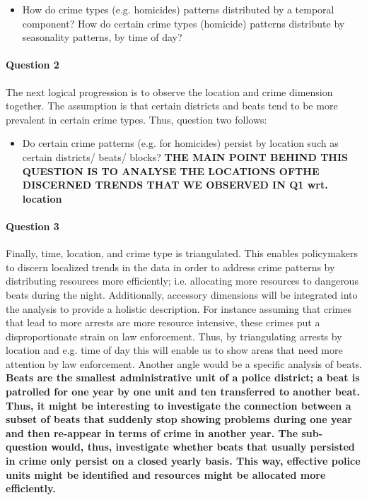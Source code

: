 \documentclass[a4paper]{article}
\begin{document}
\begin{itemize}
  \item How do crime types (e.g. homicides) patterns distributed by a temporal component? How do certain crime types (homicide) patterns distribute by seasonality patterns, by time of day?
\end{itemize}

\paragraph{Question 2} The next logical progression is to observe the location and crime dimension together. The assumption is that certain districts and beats tend to be more prevalent in certain crime types. Thus, question two follows:

\begin{itemize}
  \item Do certain crime patterns (e.g. for homicides) persist by location such as certain districts/ beats/ blocks?
  \textbf{THE MAIN POINT BEHIND THIS QUESTION IS TO ANALYSE THE LOCATIONS OFTHE DISCERNED TRENDS THAT WE OBSERVED IN Q1 wrt. location}
\end{itemize}

\paragraph{Question 3} Finally, time, location, and crime type is triangulated. This enables policymakers to discern localized trends in the data in order to address crime patterns by distributing resources more efficiently; i.e. allocating more resources to dangerous beats during the night. Additionally, accessory dimensions will be integrated into the analysis to provide a holistic description. For instance assuming that crimes that lead to more arrests are more resource intensive, these crimes put a disproportionate strain on law enforcement. Thus, by triangulating arrests by location and e.g. time of day this will enable us to show areas that need more attention by law enforcement. Another angle would be a specific analysis of beats. \textbf{Beats are the smallest administrative unit of a police district; a beat is patrolled for one year by one unit and ten transferred to another beat. Thus, it might be interesting to investigate the connection between a subset of beats that suddenly stop showing problems during one year and then re-appear in terms of crime in another year. The sub-question would, thus, investigate whether beats that usually persisted in crime only persist on a closed yearly basis. This way, effective police units might be identified and resources might be allocated more efficiently.}
 
\end{document}
